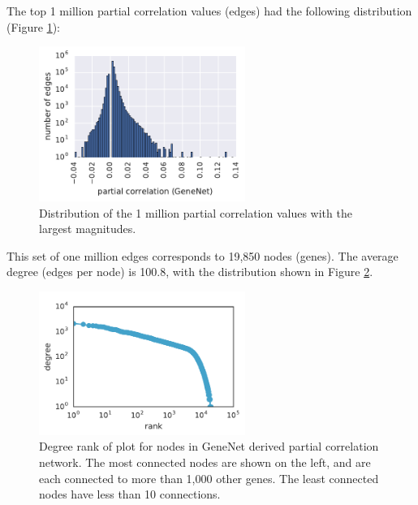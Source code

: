 The top 1 million partial correlation values (edges) had the following distribution (Figure \ref{fig:pcor_hist}): 
\begin{figure}[H]
\centering
    \includegraphics[width=0.6\textwidth]{./tex/chapter3/figures/pcor_hist--1e+06_edges.pdf}
    \begin{singlespace}
    \caption[Distribution of the 1 million partial correlation values with the largest magnitudes]{
        Distribution of the 1 million partial correlation values with the largest magnitudes.
        }
    \label{fig:pcor_hist}
    \end{singlespace}
\end{figure}
This set of one million edges corresponds to 19,850 nodes (genes).
The average degree (edges per node) is 100.8, with the distribution shown in Figure \ref{fig:degree_rank}.
\begin{figure}[H]
\centering
    \includegraphics[width=0.6\textwidth]{./tex/chapter3/figures/170406_degree_rank_plot--GeneNet_1e+06_edges--title_deleted_inkscape.pdf}
    \begin{singlespace}
    \caption[Degree rank of plot for nodes in GeneNet derived partial correlation network]{
    	Degree rank of plot for nodes in GeneNet derived partial correlation network.
	The most connected nodes are shown on the left, and are each connected to more than 1,000 other genes. 
	The least connected nodes have less than 10 connections.
        }
    \label{fig:degree_rank}
    \end{singlespace}
\end{figure}

